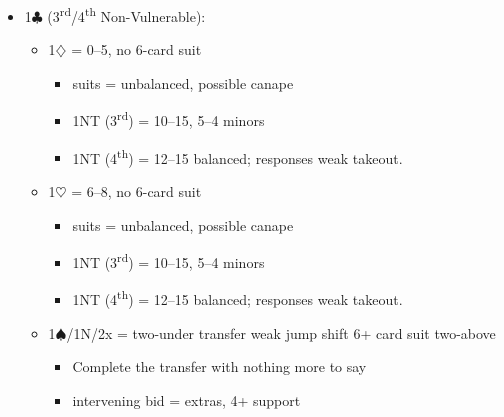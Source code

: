 \documentclass[a4paper,14pt]{extarticle}
\begin{document}
\begin{itemize}
\label{note:14}
\item 1$\clubsuit$ (3\textsuperscript{rd}/4\textsuperscript{th} Non-Vulnerable):
	\begin{itemize}
   \item 1$\diamondsuit$ = 0--5, no 6-card suit
		\begin{itemize}
      \item suits = unbalanced, possible canape
      \item 1NT (3\textsuperscript{rd}) = 10--15, 5--4 minors
      \item 1NT (4\textsuperscript{th}) = 12--15 balanced; responses weak takeout.
		\end{itemize}
   \item 1$\heartsuit$ = 6--8, no 6-card suit
		\begin{itemize}
      \item suits = unbalanced, possible canape
      \item 1NT (3\textsuperscript{rd}) = 10--15, 5--4 minors
      \item 1NT (4\textsuperscript{th}) = 12--15 balanced; responses weak takeout.
		\end{itemize}
   \item 1$\spadesuit$/1N/2x = two-under transfer weak jump shift 6+ card suit two-above
		\begin{itemize}
		\item Complete the transfer with nothing more to say
		\item intervening bid = extras, 4+ support
		\end{itemize}
	\end{itemize}

\newpage


\end{itemize}
\end{document}
